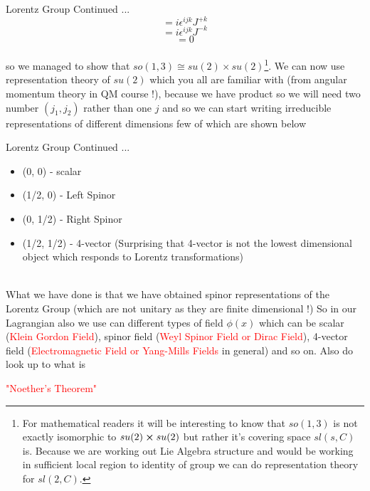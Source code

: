 \documentclass{beamer}
\begin{document}
\begin{frame}{Lorentz Group Continued ...}
\begin{equation}
    [J^{+i}, J^{+j}] = i\epsilon^{ijk}J^{+k}
\end{equation}
\begin{equation}
    [J^{-i}, J^{-j}] = i\epsilon^{ijk}J^{-k}
\end{equation}
\begin{equation}
    [J^{-i}, J^{+j}] = 0
\end{equation} \\
\vspace{5mm}
so we managed to show that $so(1, 3) \cong su(2) \times su(2)$\footnote{For mathematical readers it will be interesting to know that $so(1, 3)$ is not exactly isomorphic to $su(2) \cross su(2)$ but rather it's covering space $ sl(s, C)$ is. Because we are working out Lie Algebra structure and would be working in sufficient local region to identity of group we can do representation theory for $sl(2, C)$.}. We can now use representation theory of $su(2)$ which you all are familiar with (from angular momentum theory in QM course !), because we have product so we will need two number $(j_{1}, j_{2})$ rather than one $j$ and so we can start writing irreducible representations of different dimensions few of which are shown below
\end{frame}
\begin{frame}{Lorentz Group Continued ...}
\begin{itemize}
    \item (0, 0) - scalar
    \item (1/2, 0) - Left Spinor
    \item (0, 1/2) - Right Spinor
    \item (1/2, 1/2) - 4-vector (Surprising that 4-vector is not the lowest dimensional object which responds to Lorentz transformations)
\end{itemize} \\
\vspace{5mm}
What we have done is that we have obtained spinor representations of the Lorentz Group (which are not unitary as they are finite dimensional !)
So in our Lagrangian also we use can different types of field $\phi(x)$ which can be scalar (\textcolor{red}{Klein Gordon Field}), spinor field (\textcolor{red}{Weyl Spinor Field or Dirac Field}), 4-vector field (\textcolor{red}{Electromagnetic Field or Yang-Mills Fields} in general) and so on. Also do look up to what is 
\begin{center}
    \textcolor{red}{"Noether's Theorem"}
\end{center}
\end{frame}
\end{document}

